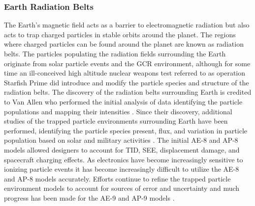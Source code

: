 \subsubsection{Earth Radiation Belts} %
\label{ssub:van_allen_radiation_belts}
The Earth's magnetic field acts as a barrier to electromagnetic radiation but also acts to trap charged particles in stable orbits around the planet.
The regions where charged particles can be found around the planet are known as radiation belts.
The particles populating the radiation fields surrounding the Earth originate from solar particle events and the GCR environment, although for some time an ill-conceived high altitude nuclear weapons test referred to as operation Starfish Prime did introduce and modify the particle species and structure of the radiation belts.
The discovery of the radiation belts surrounding Earth is credited to Van Allen who performed the initial analysis of data identifying the particle populations and mapping their intensities \cite{van1959radiation}.
Since their discovery, additional studies of the trapped particle environments surrounding Earth have been performed, identifying the particle species present, flux, and variation in particle population based on solar and military activities \cite{sawyer1976ap,vette1991ae}.
The initial AE-8 and AP-8 models allowed designers to account for TID, SEE, displacement damage, and spacecraft charging effects.
As electronics have become increasingly sensitive to ionizing particle events it has become increasingly difficult to utilize the AE-8 and AP-8 models accurately.
Efforts continue to refine the trapped particle environment models to account for sources of error and uncertainty and much progress has been made for the AE-9 and AP-9 models \cite{barth2003space,Xapsos:2013cu,Bourdarie:kj}.

